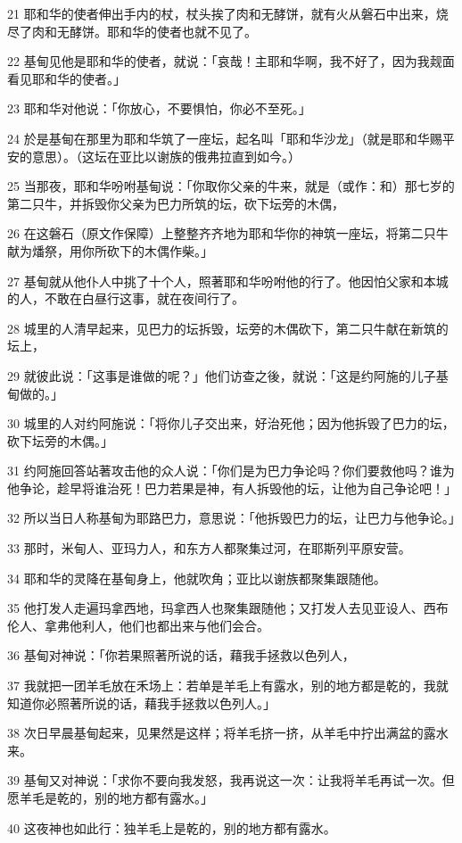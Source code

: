 \par 21 耶和华的使者伸出手内的杖，杖头挨了肉和无酵饼，就有火从磐石中出来，烧尽了肉和无酵饼。耶和华的使者也就不见了。
\par 22 基甸见他是耶和华的使者，就说：「哀哉！主耶和华啊，我不好了，因为我觌面看见耶和华的使者。」
\par 23 耶和华对他说：「你放心，不要惧怕，你必不至死。」
\par 24 於是基甸在那里为耶和华筑了一座坛，起名叫「耶和华沙龙」（就是耶和华赐平安的意思）。（这坛在亚比以谢族的俄弗拉直到如今。）
\par 25 当那夜，耶和华吩咐基甸说：「你取你父亲的牛来，就是（或作：和）那七岁的第二只牛，并拆毁你父亲为巴力所筑的坛，砍下坛旁的木偶，
\par 26 在这磐石（原文作保障）上整整齐齐地为耶和华你的神筑一座坛，将第二只牛献为燔祭，用你所砍下的木偶作柴。」
\par 27 基甸就从他仆人中挑了十个人，照著耶和华吩咐他的行了。他因怕父家和本城的人，不敢在白昼行这事，就在夜间行了。
\par 28 城里的人清早起来，见巴力的坛拆毁，坛旁的木偶砍下，第二只牛献在新筑的坛上，
\par 29 就彼此说：「这事是谁做的呢？」他们访查之後，就说：「这是约阿施的儿子基甸做的。」
\par 30 城里的人对约阿施说：「将你儿子交出来，好治死他；因为他拆毁了巴力的坛，砍下坛旁的木偶。」
\par 31 约阿施回答站著攻击他的众人说：「你们是为巴力争论吗？你们要救他吗？谁为他争论，趁早将谁治死！巴力若果是神，有人拆毁他的坛，让他为自己争论吧！」
\par 32 所以当日人称基甸为耶路巴力，意思说：「他拆毁巴力的坛，让巴力与他争论。」
\par 33 那时，米甸人、亚玛力人，和东方人都聚集过河，在耶斯列平原安营。
\par 34 耶和华的灵降在基甸身上，他就吹角；亚比以谢族都聚集跟随他。
\par 35 他打发人走遍玛拿西地，玛拿西人也聚集跟随他；又打发人去见亚设人、西布伦人、拿弗他利人，他们也都出来与他们会合。
\par 36 基甸对神说：「你若果照著所说的话，藉我手拯救以色列人，
\par 37 我就把一团羊毛放在禾场上：若单是羊毛上有露水，别的地方都是乾的，我就知道你必照著所说的话，藉我手拯救以色列人。」
\par 38 次日早晨基甸起来，见果然是这样；将羊毛挤一挤，从羊毛中拧出满盆的露水来。
\par 39 基甸又对神说：「求你不要向我发怒，我再说这一次：让我将羊毛再试一次。但愿羊毛是乾的，别的地方都有露水。」
\par 40 这夜神也如此行：独羊毛上是乾的，别的地方都有露水。

